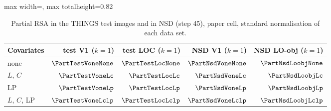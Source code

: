 \begin{table}[H]
\centering
\small
\begin{adjustbox}{max width=\textwidth, max totalheight=0.82\textheight}
\begin{tabular}{@{}lrrrr@{}}
\toprule
Covariates & test V1 ($k = 1$) & test LOC ($k = 1$) & NSD V1 ($k = 1$) & NSD LO-obj ($k = 1$) \\
\midrule
none & $\PartTestVoneNone$ & $\PartTestLocNone$ & $\PartNsdVoneNone$ & $\PartNsdLoobjNone$ \\
$L$, $C$ & $\PartTestVoneLc$ & $\PartTestLocLc$ & $\PartNsdVoneLc$ & $\PartNsdLoobjLc$ \\
LP & $\PartTestVoneLp$ & $\PartTestLocLp$ & $\PartNsdVoneLp$ & $\PartNsdLoobjLp$ \\
$L$, $C$, LP & $\PartTestVoneLclp$ & $\PartTestLocLclp$ & $\PartNsdVoneLclp$ & $\PartNsdLoobjLclp$ \\
\bottomrule
\end{tabular}
\end{adjustbox}
\caption{Partial RSA in the THINGS test images and in NSD (step 45), paper cell, standard normalisation of each data set.}
\label{tab:partialother}
\end{table}
